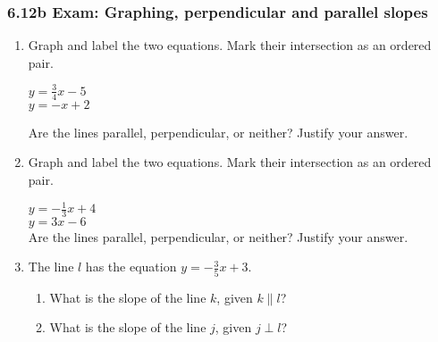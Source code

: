 \documentclass[12pt, twoside]{article}
\begin{document}
\subsubsection*{6.12b Exam: Graphing, perpendicular and parallel slopes}
  \begin{enumerate}

  \item Graph and label the two equations. Mark their intersection as an ordered pair.
    \begin{multicols}{2}
      $y =\frac{3}{4}x-5$ \\
      $y=-x+2$
    \end{multicols}     \vspace{0.1cm}
    Are the lines parallel, perpendicular, or neither? Justify your answer.
    \vspace{4cm}
    \begin{center}
    \end{center}

\newpage
  \item Graph and label the two equations. Mark their intersection as an ordered pair.
      \begin{multicols}{2}
        $y =-\frac{1}{3}x+4$ \\[0.25cm]
        $y=3x-6$ \\
        Are the lines parallel, perpendicular, or neither? Justify your answer.
      \end{multicols}     \vspace{0.1cm}
      \vspace{1cm}
      \begin{flushright} %
      \end{flushright}

  \item The line $l$ has the equation $y=-\frac{3}{5}x+3$.
  \begin{enumerate}
    \item What is the slope of the line $k$, given $k \parallel l$?
    \vspace{0.5cm}
    \item What is the slope of the line $j$, given $j \perp l$?
    \vspace{0.5cm}
  \end{enumerate}


\end{enumerate}
\end{document}
